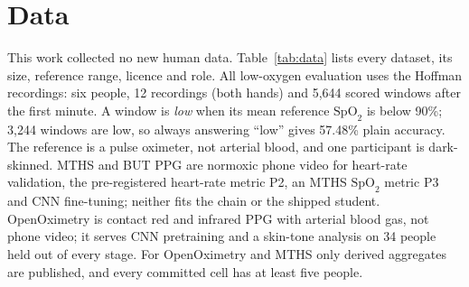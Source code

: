\documentclass[11pt,letterpaper]{article}
\newcommand{\spo}{\ensuremath{\mathrm{SpO}_2}}
\begin{document}
\section{Data}\label{sec:data}
This work collected no new human data. Table~\ref{tab:data} lists every dataset, its size, reference range, licence and role. All low-oxygen evaluation uses the Hoffman recordings: six people, 12 recordings (both hands) and 5,644 scored windows after the first minute. A window is \emph{low} when its mean reference \spo{} is below 90\%; 3,244 windows are low, so always answering ``low'' gives 57.48\% plain accuracy. The reference is a pulse oximeter, not arterial blood, and one participant is dark-skinned. MTHS and BUT PPG are normoxic phone video for heart-rate validation, the pre-registered heart-rate metric P2, an MTHS \spo{} metric P3 and CNN fine-tuning; neither fits the chain or the shipped student. OpenOximetry is contact red and infrared PPG with arterial blood gas, not phone video; it serves CNN pretraining and a skin-tone analysis on 34 people held out of every stage. For OpenOximetry and MTHS only derived aggregates are published, and every committed cell has at least five people.
\end{document}
